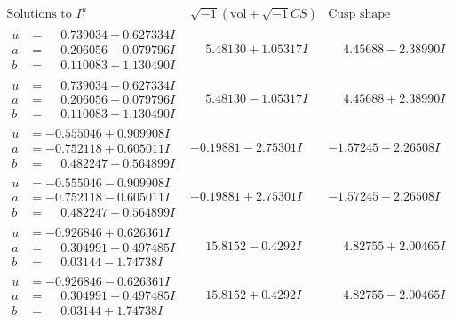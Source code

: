 \documentclass[1p]{elsarticle_modified}
\theoremstyle{definition}
\newcommand{\I}{\sqrt{-1}}
\begin{document}
$$\begin{array}{c|c|c}  
\text{Solutions to }I^u_{1}& \I (\text{vol} + \sqrt{-1}CS) & \text{Cusp shape}\\
 \hline 
\begin{aligned}
u &= \phantom{-}0.739034 + 0.627334 I \\
a &= \phantom{-}0.206056 + 0.079796 I \\
b &= \phantom{-}0.110083 + 1.130490 I\end{aligned}
 & \phantom{-}5.48130 + 1.05317 I & \phantom{-}4.45688 - 2.38990 I \\ \hline\begin{aligned}
u &= \phantom{-}0.739034 - 0.627334 I \\
a &= \phantom{-}0.206056 - 0.079796 I \\
b &= \phantom{-}0.110083 - 1.130490 I\end{aligned}
 & \phantom{-}5.48130 - 1.05317 I & \phantom{-}4.45688 + 2.38990 I \\ \hline\begin{aligned}
u &= -0.555046 + 0.909908 I \\
a &= -0.752118 + 0.605011 I \\
b &= \phantom{-}0.482247 - 0.564899 I\end{aligned}
 & -0.19881 - 2.75301 I & -1.57245 + 2.26508 I \\ \hline\begin{aligned}
u &= -0.555046 - 0.909908 I \\
a &= -0.752118 - 0.605011 I \\
b &= \phantom{-}0.482247 + 0.564899 I\end{aligned}
 & -0.19881 + 2.75301 I & -1.57245 - 2.26508 I \\ \hline\begin{aligned}
u &= -0.926846 + 0.626361 I \\
a &= \phantom{-}0.304991 - 0.497485 I \\
b &= \phantom{-}0.03144 - 1.74738 I\end{aligned}
 & \phantom{-}15.8152 - 0.4292 I & \phantom{-}4.82755 + 2.00465 I \\ \hline\begin{aligned}
u &= -0.926846 - 0.626361 I \\
a &= \phantom{-}0.304991 + 0.497485 I \\
b &= \phantom{-}0.03144 + 1.74738 I\end{aligned}
 & \phantom{-}15.8152 + 0.4292 I & \phantom{-}4.82755 - 2.00465 I \\ \hline\begin{aligned}

\end{aligned}
\end{array}$$
\end{document}
